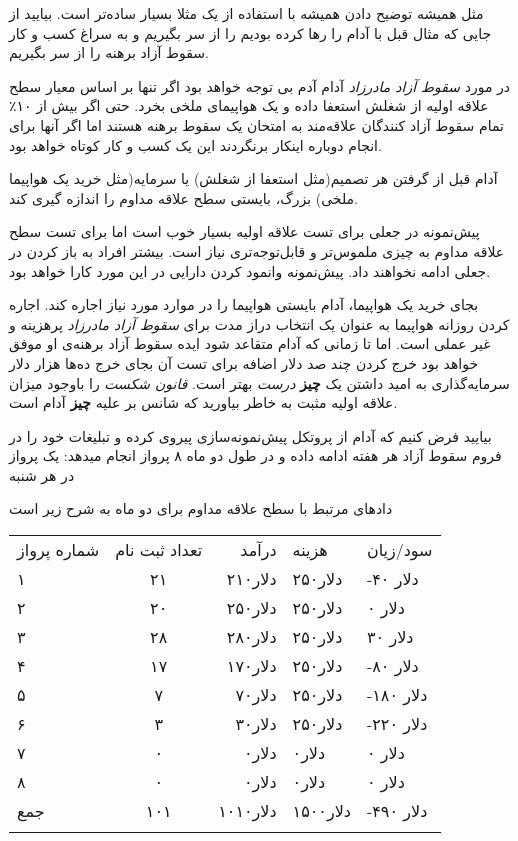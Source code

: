مثل همیشه توضیح دادن همیشه با استفاده از یک مثلا بسیار ساده‌تر است.
بیایید از جایی که مثال قبل با آدام را رها کرده‌ بودیم را از سر بگیریم و
به سراغ کسب و کار سقوط آزاد برهنه را از سر بگیریم.

در مورد \emph{سقوط آزاد مادرزاد} آدام آدم بی توجه خواهد بود اگر تنها بر
اساس معیار سطح علاقه اولیه از شغلش استعفا داده و یک هواپیمای ملخی بخرد.
حتی اگر بیش از ۱۰٪ تمام سقوط آزاد کنندگان علاقه‌مند به امتحان یک سقوط
برهنه هستند اما اگر آنها برای انجام دوباره اینکار برنگردند این یک کسب و
کار کوتاه خواهد بود.

آدام قبل از گرفتن هر تصمیم(مثل استعفا از شغلش) یا سرمایه(مثل خرید یک
هواپیما ملخی) بزرگ، بایستی سطح علاقه مداوم را اندازه گیری کند.

پیش‌نمونه در جعلی برای تست علاقه اولیه بسیار خوب است اما برای تست سطح
علاقه مداوم به چیزی ملموس‌تر و قابل‌توجه‌تری نیاز است. بیشتر افراد به
باز کردن در جعلی ادامه نخواهند داد. پیش‌نمونه وانمود کردن دارایی در این
مورد کارا خواهد بود.

بجای خرید یک هواپیما، آدام بایستی هواپیما را در موارد مورد نیاز اجاره
کند. اجاره کردن روزانه هواپیما به عنوان یک انتخاب دراز مدت برای
\emph{سقوط آزاد مادرزاد} پرهزینه و غیر عملی است. اما تا زمانی که آدام
متقاعد شود ایده سقوط آزاد برهنه‌ی او موفق خواهد بود خرج کردن چند صد دلار
اضافه برای تست آن بجای خرج ده‌ها هزار دلار سرمایه‌گذاری به امید داشتن یک
\textbf{چیز} \emph{درست} بهتر است. \emph{قانون شکست} را باوجود میزان
علاقه اولیه مثبت به خاطر بیاورید که شانس بر علیه \textbf{چیز} آدام است.

بیایید فرض کنیم که آدام از پروتکل پیش‌نمونه‌سازی پیروی کرده و تبلیغات
خود را در فروم سقوط آزاد هر هفته ادامه داده و در طول دو ماه ۸ پرواز
انجام میدهد: یک پرواز در هر شنبه

دادهای مرتبط با سطح علاقه مداوم برای دو ماه به شرح زیر است

\begin{longtable}[c]{@{}lcrll@{}}
\toprule\addlinespace
شماره پرواز & تعداد ثبت نام & درآمد & هزینه & سود/زیان
\\\addlinespace
\midrule\endhead
۱ & ۲۱ & ۲۱۰دلار & ۲۵۰دلار & -۴۰ دلار
\\\addlinespace
۲ & ۲۰ & ۲۵۰دلار & ۲۵۰دلار & ۰ دلار
\\\addlinespace
۳ & ۲۸ & ۲۸۰دلار & ۲۵۰دلار & ۳۰ دلار
\\\addlinespace
۴ & ۱۷ & ۱۷۰دلار & ۲۵۰دلار & -۸۰ دلار
\\\addlinespace
۵ & ۷ & ۷۰دلار & ۲۵۰دلار & -۱۸۰ دلار
\\\addlinespace
۶ & ۳ & ۳۰دلار & ۲۵۰دلار & -۲۲۰ دلار
\\\addlinespace
۷ & ۰ & ۰دلار & ۰دلار & ۰ دلار
\\\addlinespace
۸ & ۰ & ۰دلار & ۰دلار & ۰ دلار
\\\addlinespace
جمع & ۱۰۱ & ۱۰۱۰دلار & ۱۵۰۰دلار & -۴۹۰ دلار
\\\addlinespace
\bottomrule
\end{longtable}


